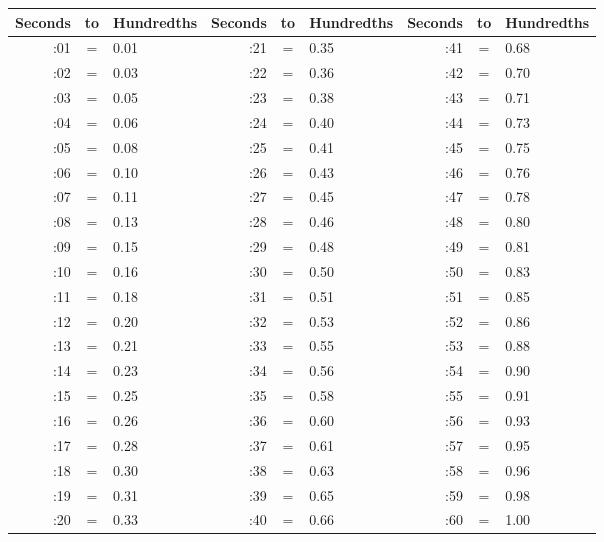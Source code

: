 \label{apdx:sec-to-hdth-conversion}
\begin{tabular}{ |rcl|rcl|rcl| }
  \hline
  Seconds & to & Hundredths & Seconds & to & Hundredths & Seconds & to & Hundredths \\
  \hline
  :01 & = & 0.01 & :21 & = & 0.35 & :41 & = & 0.68 \\
  :02 & = & 0.03 & :22 & = & 0.36 & :42 & = & 0.70 \\
  :03 & = & 0.05 & :23 & = & 0.38 & :43 & = & 0.71 \\
  :04 & = & 0.06 & :24 & = & 0.40 & :44 & = & 0.73 \\
  :05 & = & 0.08 & :25 & = & 0.41 & :45 & = & 0.75 \\
  \hline
  :06 & = & 0.10 & :26 & = & 0.43 & :46 & = & 0.76 \\
  :07 & = & 0.11 & :27 & = & 0.45 & :47 & = & 0.78 \\
  :08 & = & 0.13 & :28 & = & 0.46 & :48 & = & 0.80 \\
  :09 & = & 0.15 & :29 & = & 0.48 & :49 & = & 0.81 \\
  :10 & = & 0.16 & :30 & = & 0.50 & :50 & = & 0.83 \\
  \hline
  :11 & = & 0.18 & :31 & = & 0.51 & :51 & = & 0.85 \\
  :12 & = & 0.20 & :32 & = & 0.53 & :52 & = & 0.86 \\
  :13 & = & 0.21 & :33 & = & 0.55 & :53 & = & 0.88 \\
  :14 & = & 0.23 & :34 & = & 0.56 & :54 & = & 0.90 \\
  :15 & = & 0.25 & :35 & = & 0.58 & :55 & = & 0.91 \\
  \hline
  :16 & = & 0.26 & :36 & = & 0.60 & :56 & = & 0.93 \\
  :17 & = & 0.28 & :37 & = & 0.61 & :57 & = & 0.95 \\
  :18 & = & 0.30 & :38 & = & 0.63 & :58 & = & 0.96 \\
  :19 & = & 0.31 & :39 & = & 0.65 & :59 & = & 0.98 \\
  :20 & = & 0.33 & :40 & = & 0.66 & :60 & = & 1.00 \\
  \hline
\end{tabular}
